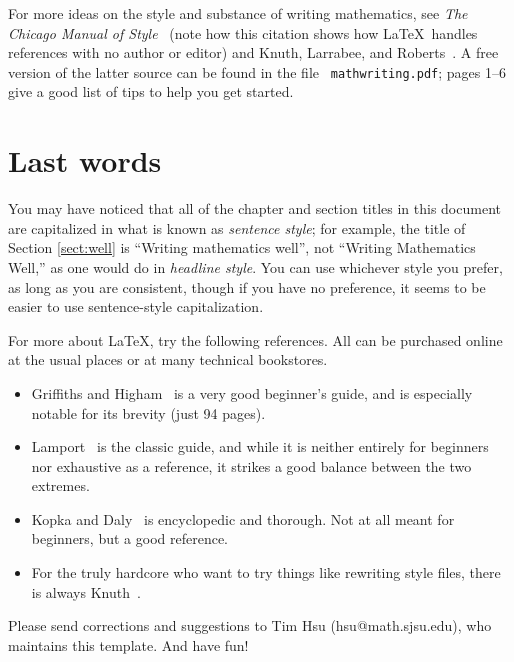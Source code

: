 \documentclass[modernstyle,12pt]{sjsuthesis}
\theoremstyle{definition}
\begin{document}
For more ideas on the style and substance of writing mathematics, see
{\it The Chicago Manual of Style\/}~\cite[Ch.\ 14]{Chicago} (note how
this citation shows how \LaTeX\ handles references with no author or
editor) and Knuth, Larrabee, and Roberts~\cite{KLR:WritingMath}.  A
free version of the latter source can be found in the file {\tt
  mathwriting.pdf\/}; pages 1--6 give a good list of tips to help you
get started.


\section{Last words}

You may have noticed that all of the chapter and section titles in
this document are capitalized in what is known as {\it sentence
  style\/}; for example, the title of Section \ref{sect:well} is
``Writing mathematics well'', not ``Writing Mathematics Well,'' as one
would do in {\it headline style}.  You can use whichever style you
prefer, as long as you are consistent, though if you have no
preference, it seems to be easier to use sentence-style
capitalization.

For more about \LaTeX, try the following references.  All can be
purchased online at the usual places or at many technical bookstores.

\begin{itemize}
\item Griffiths and Higham~\cite{GH:Latex} is a very good beginner's
  guide, and is especially notable for its brevity (just 94 pages).

\item Lamport~\cite{L:Latex} is the classic guide, and while it is
  neither entirely for beginners nor exhaustive as a reference, it
  strikes a good balance between the two extremes.

\item Kopka and Daly~\cite{KD:Latex} is encyclopedic and thorough.
  Not at all meant for beginners, but a good reference.

\item For the truly hardcore who want to try things like rewriting
  style files, there is always Knuth~\cite{K:TeX}.
\end{itemize}

Please send corrections and suggestions to Tim Hsu
(hsu@math.sjsu.edu), who maintains this template.  And have fun!
\end{document}
